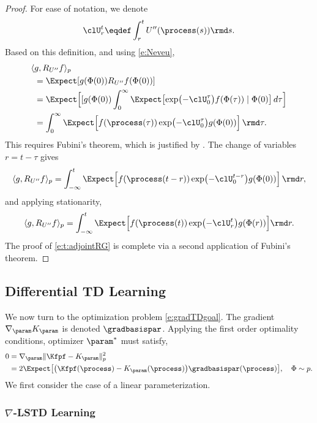 \begin{proof}
	For ease of notation, we denote
	\[
	\clU_r^t \eqdef \int_{r}^{t} U''(\process(s)) \rmd s.
	\]
	Based on this definition,  and using \eqref{e:Neveu},  
	\begin{equation*}
	\begin{aligned}
	\langle &g, R_{U''}   f \rangle_p 
	\\
	& =\Expect[g(\Phi(0))R_{U''}f(\Phi(0))]
	\\
	& = \Expect\Bigl[  [g(\Phi(0))\int_{0}^{\infty} \Expect\bigl[\exp\bigl(- \clU_0^\tau  \bigr)f(\Phi(\tau)) \mid \Phi(0)\bigr]\,d\tau \Bigr]
	\\
	& =\int_0^\infty \Expect\Bigl[ f(\process(\tau))  \exp\bigl(- \clU_0^\tau  \bigr) g(\Phi(0)) \Bigr]\, \rmd\tau.
	\end{aligned}
	\end{equation*}
	This requires Fubini's theorem, which is justified by . The change of variables $r = t - \tau$ gives
	\[
	\langle g, R_{U''} f \rangle_p =
	\int_{-\infty}^t  \Expect\Bigl[ f(\process(t-r))  \exp \bigl(- \clU_0^{t-r} \bigr) g(\Phi(0))\Bigr]\, \rmd r,
	\]
	and applying stationarity,
	\[
	\langle g, R_{U''} f \rangle_p =
	\int_{-\infty}^t \Expect\Bigl[ f(\process(t)) \exp\bigl(- \clU_r^t \bigr) g(\Phi(r))\Bigr] \rmd r.
	\]
	The proof of \eqref{e:t:adjointRG}
	is complete via a second application of Fubini's theorem.
\end{proof}




\subsection{Differential TD Learning}
We now turn to the optimization problem \eqref{e:gradTDgoal}.  The gradient $\nabla_{\param}K_\param$ is denoted $\gradbasispar $.  Applying the first order optimality conditions, optimizer $\param^*$ must satisfy,
\begin{equation}
\begin{aligned}
0 & = \nabla_{\param} \|\Kfpf - K_{\param}\|_{p}^{2}\\
& = 2 \Expect \bigl[\bigl(\Kfpf(\process) - K_{\param}(\process)\bigr) \gradbasispar (\process)\bigr], \quad \Phi \sim p.
\label{eq_td_derivation}
\end{aligned}
\end{equation}
We first consider the case of a linear parameterization.

\subsubsection*{$\nabla$-LSTD Learning}

